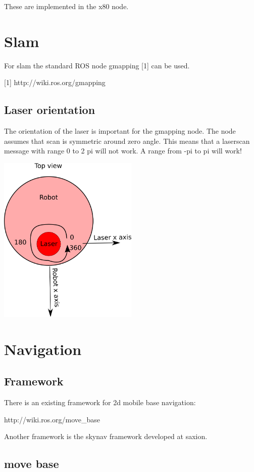 \documentclass[a4paper]{article}
\begin{document}
These are implemented in the x80 node.

\section{Slam}

For slam the standard ROS node gmapping [1] can be used.

[1] http://wiki.ros.org/gmapping

\subsection{Laser orientation}
The orientation of the laser is important for the gmapping node. The node assumes that
scan is symmetric around zero angle. This means that a laserscan message with range
0 to 2 pi will not work. A range from -pi to pi will work!

\includegraphics[width=0.5\textwidth,height=\textheight,keepaspectratio]{img/laser_orientation.png}


\section{Navigation}

\subsection{Framework}

There is an existing framework for 2d mobile base navigation:

http://wiki.ros.org/move\_base

Another framework is the skynav framework developed at saxion.


\subsection{move base}
\end{document}
